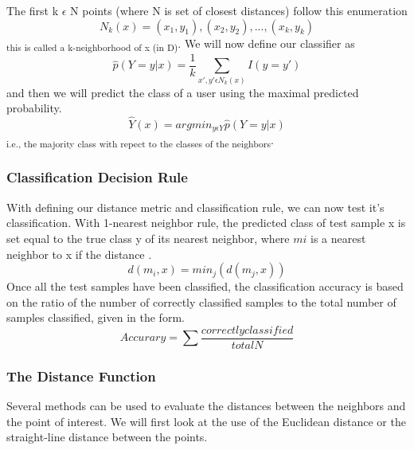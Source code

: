 \documentclass{report}
\begin{document}
The first k $\epsilon$ N points (where N is set of closest distances) follow this  enumeration 
\begin{equation}
N_{k}(x) = (x_{1}, y_{1}), (x_{2}, y_{2}), ... , (x_{k}, y_{k}) 
\end{equation} 
\textsubscript{this is called a k-neighborhood of x (in D)}. \newline\newline
We will now define our classifier as 
\begin{equation}
\hat{p}(Y = y | x) = \frac{1}{k} \sum_{x',y' \epsilon N_{k}(x) }  I(y = y')
\end{equation}
and then we will predict the class of a user using the maximal predicted probability.
\begin{equation}
\hat{Y}(x) = argmin_{y \epsilon Y} \hat{p}(Y = y |x)
\end{equation}
\textsubscript{i.e., the majority class with repect to the classes of the neighbors}. \newline\newline

\subsubsection*{Classification Decision Rule}
With defining our distance metric and classification rule, we can now test it's classification.
With 1-nearest neighbor rule, the predicted class of test sample x is set equal to the true class y of its nearest neighbor, where $mi$ is a nearest neighbor to x if the distance \cite{7}.
\begin{equation}
d(m_{i},x) = min_{j}(d(m_{j},x))
\end{equation} 
Once all the test samples have been classified, the classification accuracy is based on the ratio of the number of correctly classified samples to the total number of samples classified, given in the form.
\begin{equation}
Accurary = \sum \frac{correctly classified}{total N}
\end{equation}
		


\subsubsection*{The Distance Function}

Several methods can be used to evaluate the distances between the neighbors and the point of interest.
We will first look at the use of the Euclidean distance or the straight-line distance between the points.
\end{document}
